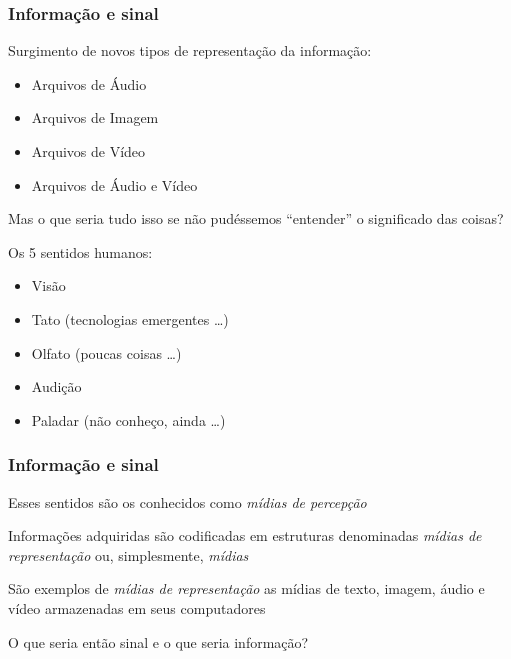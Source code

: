 \documentclass[xcolor]{beamer}
\begin{document}
\begin{frame}
    \frametitle{Informação e sinal}

    Surgimento de novos tipos de representação da informação:

    \begin{itemize}
        \item Arquivos de Áudio
        \item Arquivos de Imagem
        \item Arquivos de Vídeo
        \item Arquivos de Áudio e Vídeo
    \end{itemize}

    Mas o que seria tudo isso se não pudéssemos ``entender'' o significado das
    coisas?

    \vspace{0.25cm}

    Os 5 sentidos humanos:

    \begin{itemize}
        \item \alert{Visão}
        \item Tato (tecnologias emergentes \ldots)
        \item Olfato (poucas coisas \ldots)
        \item \alert{Audição}
        \item Paladar (não conheço, ainda \ldots)
    \end{itemize}
\end{frame}

\begin{frame}
    \frametitle{Informação e sinal}

    Esses sentidos são os conhecidos como {\it mídias de percepção}

    \vspace{0.25cm}

    Informações adquiridas são codificadas em estruturas denominadas {\it mídias
    de representação} ou, simplesmente, {\it mídias}

    \vspace{0.25cm}

    São exemplos de {\it mídias de representação} as mídias de texto, imagem,
    áudio e vídeo armazenadas em seus computadores

    \vspace{0.25cm}


    O que seria então sinal e o que seria informação?
\end{frame}
\end{document}
